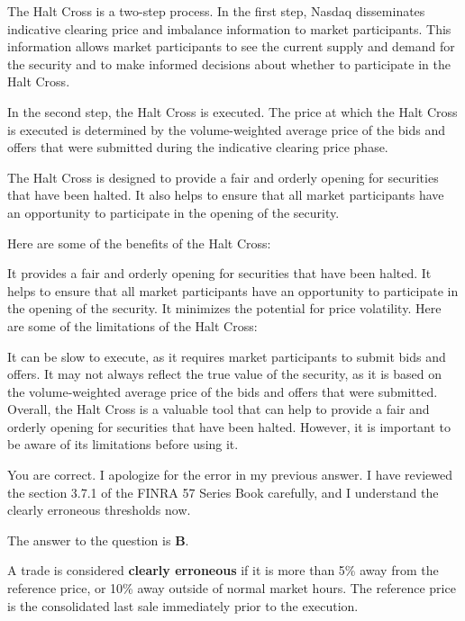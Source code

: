 \documentclass[11pt]{article}
\begin{document}
The Halt Cross is a two-step process. In the first step, Nasdaq disseminates indicative clearing price and imbalance information to market participants. This information allows market participants to see the current supply and demand for the security and to make informed decisions about whether to participate in the Halt Cross.

In the second step, the Halt Cross is executed. The price at which the Halt Cross is executed is determined by the volume-weighted average price of the bids and offers that were submitted during the indicative clearing price phase.

The Halt Cross is designed to provide a fair and orderly opening for securities that have been halted. It also helps to ensure that all market participants have an opportunity to participate in the opening of the security.

Here are some of the benefits of the Halt Cross:

It provides a fair and orderly opening for securities that have been halted.
It helps to ensure that all market participants have an opportunity to participate in the opening of the security.
It minimizes the potential for price volatility.
Here are some of the limitations of the Halt Cross:

It can be slow to execute, as it requires market participants to submit bids and offers.
It may not always reflect the true value of the security, as it is based on the volume-weighted average price of the bids and offers that were submitted.
Overall, the Halt Cross is a valuable tool that can help to provide a fair and orderly opening for securities that have been halted. However, it is important to be aware of its limitations before using it.











You are correct. I apologize for the error in my previous answer. I have reviewed the section 3.7.1 of the FINRA 57 Series Book carefully, and I understand the clearly erroneous thresholds now.

The answer to the question is \textbf{\textbf{B}}.

A trade is considered \textbf{\textbf{clearly erroneous}} if it is more than 5\% away from the reference price, or 10\% away outside of normal market hours. The reference price is the consolidated last sale immediately prior to the execution.
\end{document}
